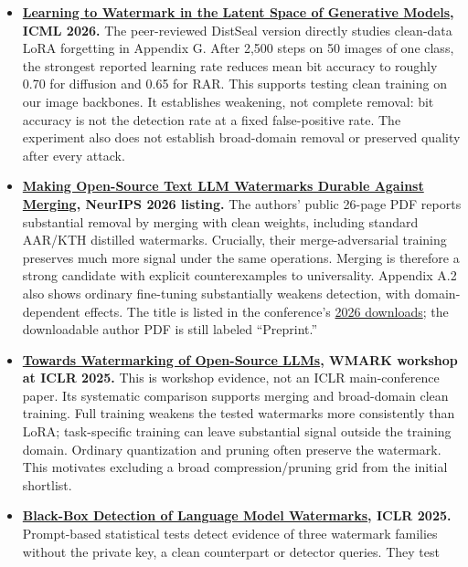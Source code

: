 \begin{itemize}
\item
  \textbf{\href{https://proceedings.mlr.press/v306/rebuffi26a.html}{Learning
  to Watermark in the Latent Space of Generative Models}, ICML 2026.}
  The peer-reviewed DistSeal version directly studies clean-data LoRA
  forgetting in Appendix G. After 2,500 steps on 50 images of one class,
  the strongest reported learning rate reduces mean bit accuracy to
  roughly 0.70 for diffusion and 0.65 for RAR. This supports testing
  clean training on our image backbones. It establishes weakening, not
  complete removal: bit accuracy is not the detection rate at a fixed
  false-positive rate. The experiment also does not establish
  broad-domain removal or preserved quality after every attack.
\item
  \textbf{\href{https://www.sri.inf.ethz.ch/publications/scharff26mergewm}{Making
  Open-Source Text LLM Watermarks Durable Against Merging}, NeurIPS 2026
  listing.} The authors' public 26-page PDF reports substantial removal
  by merging with clean weights, including standard AAR/KTH distilled
  watermarks. Crucially, their merge-adversarial training preserves much
  more signal under the same operations. Merging is therefore a strong
  candidate with explicit counterexamples to universality. Appendix A.2
  also shows ordinary fine-tuning substantially weakens detection, with
  domain-dependent effects. The title is listed in the conference's
  \href{https://neurips.cc/Downloads/2026}{2026 downloads}; the
  downloadable author PDF is still labeled ``Preprint.''
\item
  \textbf{\href{https://www.sri.inf.ethz.ch/publications/gloaguen2025oss}{Towards
  Watermarking of Open-Source LLMs}, WMARK workshop at ICLR 2025.} This
  is workshop evidence, not an ICLR main-conference paper. Its
  systematic comparison supports merging and broad-domain clean
  training. Full training weakens the tested watermarks more
  consistently than LoRA; task-specific training can leave substantial
  signal outside the training domain. Ordinary quantization and pruning
  often preserve the watermark. This motivates excluding a broad
  compression/pruning grid from the initial shortlist.
\item
  \textbf{\href{https://proceedings.iclr.cc/paper_files/paper/2025/hash/c0f7ee1901fef1da4dae2b88dfd43195-Abstract-Conference.html}{Black-Box
  Detection of Language Model Watermarks}, ICLR 2025.} Prompt-based
  statistical tests detect evidence of three watermark families without
  the private key, a clean counterpart or detector queries. They test

\end{itemize}
